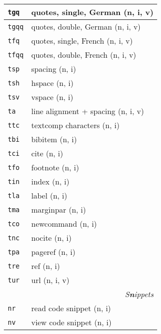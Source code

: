 \documentclass[oneside,10pt,landscape,DIV17]{scrartcl}
\newcommand{\Map}[1] {\textbf{\textasciiacute}\texttt{#1}}
\begin{document}
\begin{multicols}{3}
\begin{center}
\begin{tabular}[]{|p{11mm}|p{60mm}|}
\hline \Map{tgq}  & quotes, single, German         \hfill (n, i, v)\\
\hline \Map{tgqq} & quotes, double, German         \hfill (n, i, v)\\
\hline \Map{tfq}  & quotes, single, French         \hfill (n, i, v)\\
\hline \Map{tfqq} & quotes, double, French         \hfill (n, i, v)\\
\hline \Map{tsp}  & spacing                        \hfill (n, i)\\
\hline \Map{tsh}  & hspace                         \hfill (n, i)\\
\hline \Map{tsv}  & vspace                         \hfill (n, i)\\
\hline \Map{ta}   & line alignment + spacing       \hfill (n, i, v)\\
\hline \Map{ttc}  & textcomp characters            \hfill (n, i)\\
\hline
\hline \Map{tbi}  & bibitem                        \hfill (n, i)\\
\hline \Map{tci}  & cite                           \hfill (n, i)\\
\hline \Map{tfo}  & footnote                       \hfill (n, i)\\
\hline \Map{tin}  & index                          \hfill (n, i)\\
\hline \Map{tla}  & label                          \hfill (n, i)\\
\hline \Map{tma}  & marginpar                      \hfill (n, i)\\
\hline \Map{tco}  & newcommand                     \hfill (n, i)\\
\hline \Map{tnc}  & nocite                         \hfill (n, i)\\
\hline \Map{tpa}  & pageref                        \hfill (n, i)\\
\hline \Map{tre}  & ref                            \hfill (n, i)\\
\hline \Map{tur}  & url                            \hfill (n, i, v)\\
\hline
\hline
\multicolumn{2}{|r|}{\textsl{S\textbf{n}ippets}}                \\[1.0ex]
\hline \Map{nr}  & read code snippet         \hfill (n, i)   \\
\hline \Map{nv}  & view code snippet         \hfill (n, i)   \\

\end{tabular}
\end{center}
\end{multicols}
\end{document}
